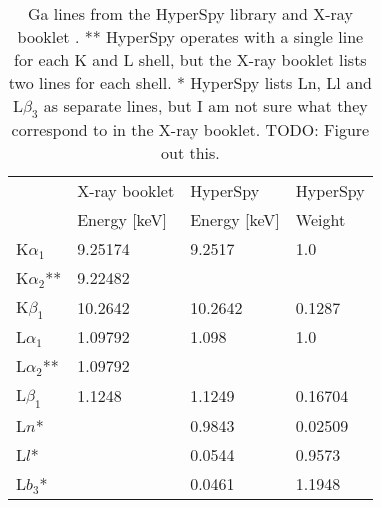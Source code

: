 
\begin{table}[tbp]
    \centering
    \caption{
        Ga lines from the HyperSpy library \cite{hyperspy_1.7.1} and X-ray booklet \cite{thompson_x-ray_2004}.
        ** HyperSpy operates with a single line for each K and L shell, but the X-ray booklet lists two lines for each shell.
        * HyperSpy lists Ln, Ll and L$\beta_3$ as separate lines, but I am not sure what they correspond to in the X-ray booklet.
        TODO: Figure out this.
    }
    \label{tab:theory:Ga-lines}
    \begin{tabular}{llll}
                       & X-ray booklet & HyperSpy     & HyperSpy \\
                       & Energy [keV]  & Energy [keV] & Weight   \\
        \hline
        K$ \alpha_1$   & 9.25174       & 9.2517       & 1.0      \\
        K$ \alpha_2$** & 9.22482       &              &          \\
        K$ \beta_1$    & 10.2642       & 10.2642      & 0.1287   \\
        L$ \alpha_1$   & 1.09792       & 1.098        & 1.0      \\
        L$ \alpha_2$** & 1.09792       &              &          \\
        L$ \beta_1$    & 1.1248        & 1.1249       & 0.16704  \\
        L$n$*          &               & 0.9843       & 0.02509  \\
        L$l$*          &               & 0.0544       & 0.9573   \\
        L$b_3$*        &               & 0.0461       & 1.1948
    \end{tabular}

\end{table}